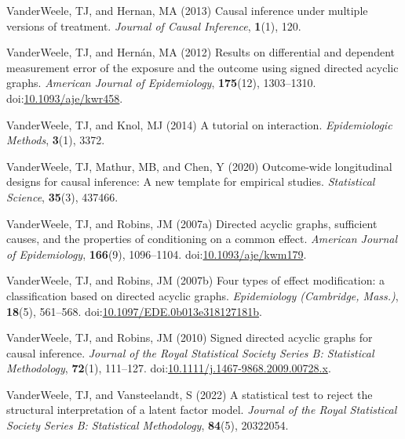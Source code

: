 \documentclass[
  singlecolumn]{article}
\newlength{\cslhangindent}
\newlength{\cslentryspacingunit} %
\newenvironment{CSLReferences}[2] %
 {%
  \setlength{\parindent}{0pt}
  \ifodd #1
  \let\oldpar\par
  \def\par{\hangindent=\cslhangindent\oldpar}
  \fi
  \setlength{\parskip}{#2\cslentryspacingunit}
 }%
 {}
\begin{document}
\begin{CSLReferences}{1}{0}
\leavevmode{}%
VanderWeele, TJ, and Hernan, MA (2013) Causal inference under multiple
versions of treatment. \emph{Journal of Causal Inference},
\textbf{1}(1), 120.

\leavevmode{}%
VanderWeele, TJ, and Hernán, MA (2012) Results on differential and
dependent measurement error of the exposure and the outcome using signed
directed acyclic graphs. \emph{American Journal of Epidemiology},
\textbf{175}(12), 1303--1310.
doi:\href{https://doi.org/10.1093/aje/kwr458}{10.1093/aje/kwr458}.

\leavevmode{}%
VanderWeele, TJ, and Knol, MJ (2014) A tutorial on interaction.
\emph{Epidemiologic Methods}, \textbf{3}(1), 3372.

\leavevmode{}%
VanderWeele, TJ, Mathur, MB, and Chen, Y (2020) Outcome-wide
longitudinal designs for causal inference: A new template for empirical
studies. \emph{Statistical Science}, \textbf{35}(3), 437466.

\leavevmode{}%
VanderWeele, TJ, and Robins, JM (2007a) Directed acyclic graphs,
sufficient causes, and the properties of conditioning on a common
effect. \emph{American Journal of Epidemiology}, \textbf{166}(9),
1096--1104.
doi:\href{https://doi.org/10.1093/aje/kwm179}{10.1093/aje/kwm179}.

\leavevmode{}%
VanderWeele, TJ, and Robins, JM (2007b) Four types of effect
modification: a classification based on directed acyclic graphs.
\emph{Epidemiology (Cambridge, Mass.)}, \textbf{18}(5), 561--568.
doi:\href{https://doi.org/10.1097/EDE.0b013e318127181b}{10.1097/EDE.0b013e318127181b}.

\leavevmode{}%
VanderWeele, TJ, and Robins, JM (2010) Signed directed acyclic graphs
for causal inference. \emph{Journal of the Royal Statistical Society
Series B: Statistical Methodology}, \textbf{72}(1), 111--127.
doi:\href{https://doi.org/10.1111/j.1467-9868.2009.00728.x}{10.1111/j.1467-9868.2009.00728.x}.

\leavevmode{}%
VanderWeele, TJ, and Vansteelandt, S (2022) A statistical test to reject
the structural interpretation of a latent factor model. \emph{Journal of
the Royal Statistical Society Series B: Statistical Methodology},
\textbf{84}(5), 20322054.


\end{CSLReferences}
\end{document}
